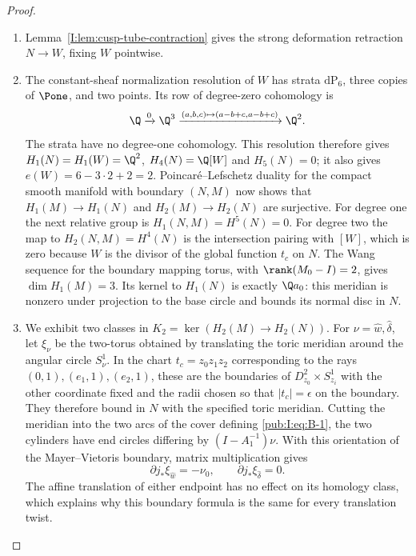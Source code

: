 \begin{proof}
\begin{enumerate}[label=\arabic*.,leftmargin=*]
\item Lemma~\ref{I:lem:cusp-tube-contraction} gives the strong
deformation retraction $N\to W$, fixing $W$ pointwise.

\item The constant-sheaf normalization resolution of $W$ has strata
$\mathrm{dP}_6$, three copies of $\Pone$, and two points.
Its row of degree-zero cohomology is
\[
 \Q\xrightarrow{0}\Q^3
 \xrightarrow{(a,b,c)\mapsto(a-b+c,a-b+c)}\Q^2.
\]
The strata have no degree-one cohomology. This resolution therefore
gives $H_1(N)=H_1(W)=\Q^2$, $H_4(N)=\Q[W]$ and $H_5(N)=0$;
it also gives $e(W)=6-3\cdot2+2=2$.
Poincar\'e--Lefschetz duality for the compact smooth manifold with
boundary $(N,M)$ now shows that $H_1(M)\to H_1(N)$ and
$H_2(M)\to H_2(N)$ are surjective. For degree one the next
relative group is $H_1(N,M)=H^5(N)=0$.
For degree two the map to $H_2(N,M)=H^4(N)$ is the intersection
pairing with $[W]$, which is zero because $W$ is the divisor of
the global function $t_c$ on $N$. The Wang sequence for the
boundary mapping torus, with $\rank(M_0-I)=2$, gives
$\dim H_1(M)=3$. Its kernel to $H_1(N)$ is exactly
$\Q a_0$: this meridian is nonzero under projection to the base
circle and bounds its normal disc in $N$.

\item We exhibit two classes in
$K_2=\ker(H_2(M)\to H_2(N))$.
For $\nu=\hat w,\hat\delta$, let $\xi_\nu$ be the two-torus
obtained by translating the toric meridian around the angular
circle $S^1_\nu$. In the chart $t_c=z_0z_1z_2$ corresponding to
the rays $(0,1),(e_1,1),(e_2,1)$, these are the boundaries of
$D^2_{z_0}\times S^1_{z_i}$ with the other coordinate fixed
and the radii chosen so that $|t_c|=\epsilon$ on the boundary.
They therefore bound in $N$ with the specified toric meridian.
Cutting the meridian into the two arcs of the cover defining
\eqref{pub:I:eq:B-1}, the two cylinders have end circles differing by
$(I-A_1^{-1})\nu$. With this orientation of the Mayer--Vietoris
boundary, matrix multiplication gives
\begin{equation}
 \partial j_*\xi_{\hat w}=-\nu_0,\qquad
 \partial j_*\xi_{\hat\delta}=0.
\label{pub:I:eq:B-3}
\end{equation}
The affine translation of either endpoint has no effect on its
homology class, which explains why this boundary formula is the
same for every translation twist.


\end{enumerate}
\end{proof}
